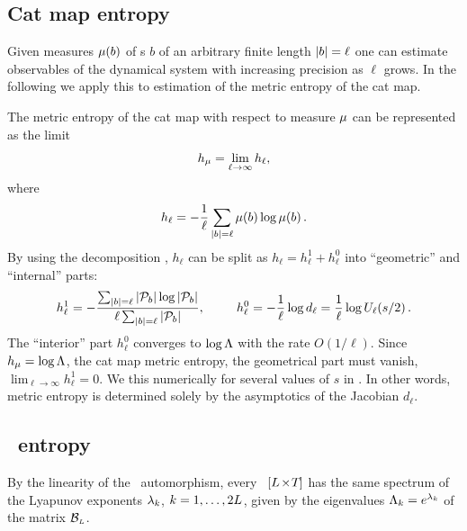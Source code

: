 \documentclass[12pt]{iopart}
\begin{document}
\subsection{Cat map entropy}
\label{sect:catEntropy}

Given  measures  ${\mu}({b})$ of {\brick s} $ {b}$ of an arbitrary finite
length ${|b|}=\ell$ one can estimate observables of the dynamical system
with increasing  precision as $\ell$ grows. In the following we apply
this  to estimation of the metric entropy of the cat map.

The metric entropy  of the cat map with respect to measure ${\mu}$ can be
represented as the limit
\begin{equation}
h_{\mu} =\lim_{{\ell}\to\infty} {h}_\ell,
\label{EntropyEigenvalue}
\end{equation}
where
\[
h_\ell = -\frac{1}{\ell} \sum_{|{b}|=\ell}{{\mu}({b}) \log{{\mu}({b})}}
\,.
\]
By using the decomposition , $h_\ell$  can be split as
$h_\ell=h_\ell^{1}+h_\ell^{0}$ into ``geometric'' and ``internal'' parts:
\[
h_\ell^{1}=
-\frac{\sum_{|{b}|=\ell}{|\mathcal{P}_{{b}}| \log{|\mathcal{P}_{{b}}|}}}{\ell \sum_{|{b}|=\ell}{|\mathcal{P}_{{b}}| }},
\hspace*{25pt}
h_\ell^{0}=-\frac{1}{\ell}\log d_\ell
          = \frac{1}{\ell}\log U_{\ell}({s}/{2})
\,.
\]
The ``interior'' part $h_\ell^{0}$ converges to $\log \Lambda$ with the
rate $O(1/\ell)$. Since $h_{\mu}=\log \Lambda$, the cat  map  metric
entropy,  the geometrical part must vanish,
$\lim_{{\ell}\to\infty}h_\ell^{1}=0$. We  this numerically for
several values of $s$ in . In other words,
metric entropy  is determined solely by the asymptotics of the Jacobian
$d_\ell$.


\subsection{\catLatt\ entropy}
\label{sect:catLattEntropy}

By the linearity of the \catlatt\ automorphism, every \catlatt\
$[{L_{}}\!\times\!{T_{}}]$ {\twot} has the same spectrum of  the
Lyapunov exponents  $\lambda_k$, $k=1,\dots,2{L_{}}$, given by the
eigenvalues \refeq{qudreq} $\Lambda_k =e^{\lambda_k}$ of the matrix
$\mathcal{B}_{\scriptscriptstyle L}$.
\end{document}
